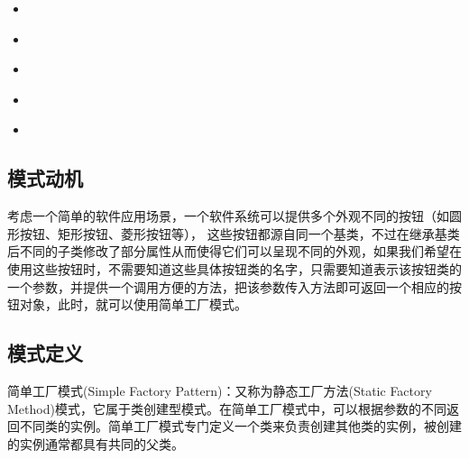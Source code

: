 \documentclass[letterpaper,10pt,english]{sphinxmanual}
\begin{document}
\begin{sphinxShadowBox}
\begin{itemize}
\begin{itemize}
\item {} 
\sphinxAtStartPar
{}\label{\detokenize{creational_patterns/simple_factory:id22}}{\hyperref[\detokenize{creational_patterns/simple_factory:id9}]{}}

\item {} 
\sphinxAtStartPar
{}\label{\detokenize{creational_patterns/simple_factory:id23}}{\hyperref[\detokenize{creational_patterns/simple_factory:id10}]{}}

\item {} 
\sphinxAtStartPar
{}\label{\detokenize{creational_patterns/simple_factory:id24}}{\hyperref[\detokenize{creational_patterns/simple_factory:id11}]{}}

\item {} 
\sphinxAtStartPar
{}\label{\detokenize{creational_patterns/simple_factory:id25}}{\hyperref[\detokenize{creational_patterns/simple_factory:id12}]{}}

\item {} 
\sphinxAtStartPar
{}\label{\detokenize{creational_patterns/simple_factory:id26}}{\hyperref[\detokenize{creational_patterns/simple_factory:id13}]{}}

\end{itemize}

\end{itemize}
\end{sphinxShadowBox}


\subsection{模式动机}
\label{\detokenize{creational_patterns/simple_factory:id2}}
\sphinxAtStartPar
考虑一个简单的软件应用场景，一个软件系统可以提供多个外观不同的按钮（如圆形按钮、矩形按钮、菱形按钮等），
这些按钮都源自同一个基类，不过在继承基类后不同的子类修改了部分属性从而使得它们可以呈现不同的外观，如果我们希望在使用这些按钮时，不需要知道这些具体按钮类的名字，只需要知道表示该按钮类的一个参数，并提供一个调用方便的方法，把该参数传入方法即可返回一个相应的按钮对象，此时，就可以使用简单工厂模式。


\subsection{模式定义}
\label{\detokenize{creational_patterns/simple_factory:id3}}
\sphinxAtStartPar
简单工厂模式(Simple Factory Pattern)：又称为静态工厂方法(Static Factory Method)模式，它属于类创建型模式。在简单工厂模式中，可以根据参数的不同返回不同类的实例。简单工厂模式专门定义一个类来负责创建其他类的实例，被创建的实例通常都具有共同的父类。
\end{document}
